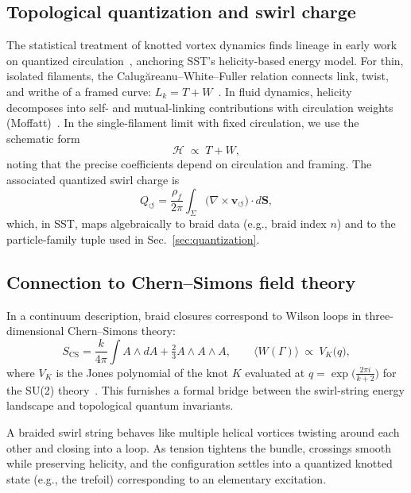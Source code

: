 \documentclass[10pt,reprint,aps,onecolumn,nofootinbib]{revtex4-2}
\begin{document}
        \subsection*{Topological quantization and swirl charge}
            The statistical treatment of knotted vortex dynamics finds lineage in early work on quantized circulation~\cite{Onsager1949}, anchoring SST’s helicity-based energy model.
            For thin, isolated filaments, the Calugăreanu–White–Fuller relation connects link, twist, and writhe of a framed curve: \(L_k = T + W\)~\cite{Calugareanu1959,White1969,Fuller1971}. In fluid dynamics, helicity decomposes into self- and mutual-linking contributions with circulation weights (Moffatt)~\cite{Moffatt1969}. In the single-filament limit with fixed circulation, we use the schematic form
            \[
                \mathcal{H} \;\propto\; T + W,
            \]
            noting that the precise coefficients depend on circulation and framing. The associated quantized swirl charge is
            \[
                Q_{\!\circlearrowleft} = \frac{\rho_f}{2\pi}\int_{\Sigma} \big(\nabla\times \mathbf{v}_{\!\boldsymbol{\circlearrowleft}}\big)\cdot d\mathbf{S},
            \]
            which, in SST, maps algebraically to braid data (e.g., braid index \(n\)) and to the particle-family tuple used in Sec.~\ref{sec:quantization}.

        \subsection*{Connection to Chern–Simons field theory}
            In a continuum description, braid closures correspond to Wilson loops in three-dimensional Chern–Simons theory:
            \[
                S_{\mathrm{CS}} = \frac{k}{4\pi}\int A\wedge dA + \tfrac{2}{3}A\wedge A\wedge A,\qquad
                \langle W(\Gamma)\rangle \ \propto\ V_K\!\big(q\big),
            \]
            where \(V_K\) is the Jones polynomial of the knot \(K\) evaluated at \(q=\exp\!\big(\frac{2\pi i}{k+2}\big)\) for the SU(2) theory~\cite{Witten1989}. This furnishes a formal bridge between the swirl-string energy landscape and topological quantum invariants.

            \begin{tcolorbox}[colframe=gray,title={Physical Picture}]
                A braided swirl string behaves like multiple helical vortices twisting around each other and closing into a loop. As tension tightens the bundle, crossings smooth while preserving helicity, and the configuration settles into a quantized knotted state (e.g., the trefoil) corresponding to an elementary excitation.
            \end{tcolorbox}
\end{document}

